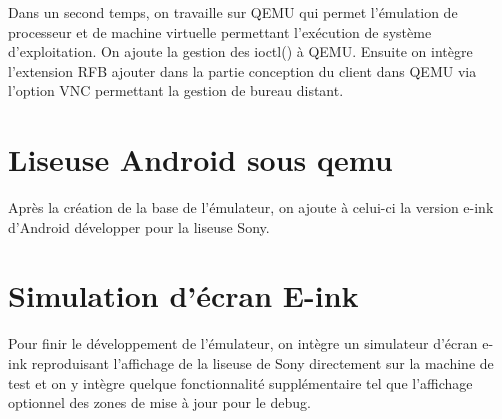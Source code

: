 Dans un second temps, on travaille sur QEMU qui permet l'émulation de processeur et de machine virtuelle permettant l'exécution de système d'exploitation. On ajoute la gestion des ioctl() à QEMU. Ensuite on intègre l'extension RFB ajouter dans la partie conception du client dans QEMU via l'option VNC permettant la gestion de bureau distant.

\section{Liseuse Android sous qemu}

Après la création de la base de l'émulateur, on ajoute à celui-ci la version e-ink d'Android développer pour la liseuse Sony. 

\section{Simulation d'écran E-ink}

Pour finir le développement de l'émulateur, on intègre un simulateur d'écran e-ink reproduisant l'affichage de la liseuse de Sony directement sur la machine de test et on y intègre quelque fonctionnalité supplémentaire tel que l'affichage optionnel des zones de mise à jour pour le debug.
